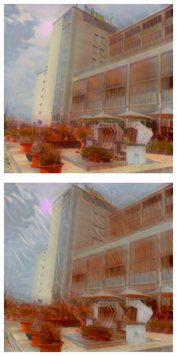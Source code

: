 \begin{figure}[H]
    \centering
    \begin{subfigure}[h]{0.24\textwidth}
        \centering
        \includegraphics[width=\textwidth]{resources/content/experiments/a__the_scream__768x768__style-weight_1e+06__tv-weight_0e+00.jpg}
    \end{subfigure}
    \begin{subfigure}[h]{0.24\textwidth}
        \centering
        \includegraphics[width=\textwidth]{resources/content/experiments/a__the_scream__768x768__style-weight_1e+07__tv-weight_0e+00.jpg}

\end{subfigure}
\end{figure}
